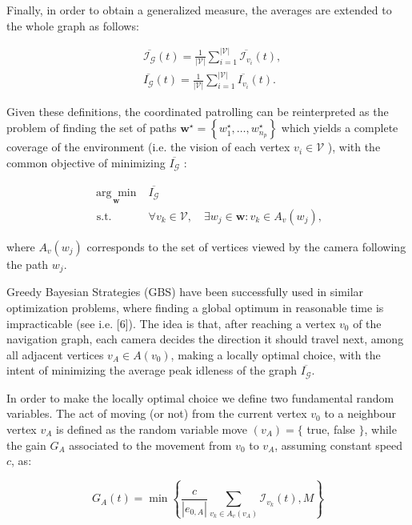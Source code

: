 \documentclass[conference]{IEEEtran}
\begin{document}
Finally, in order to obtain a generalized measure, the averages are extended to the whole graph as follows:


\begin{align*}
& \overline{\mathcal{I}_{\mathcal{G}}}(t)=\frac{1}{|\mathcal{V}|} \sum_{i=1}^{|\mathcal{V}|} \overline{\mathcal{I}_{v_{i}}}(t),  \tag{12}\\
& \overline{I_{\mathcal{G}}}(t)=\frac{1}{|\mathcal{V}|} \sum_{i=1}^{|\mathcal{V}|} \overline{I_{v_{i}}}(t) . \tag{13}
\end{align*}


Given these definitions, the coordinated patrolling can be reinterpreted as the problem of finding the set of paths $\mathbf{w}^{\star}=\left\{w_{1}^{\star}, \ldots, w_{n_{p}}^{\star}\right\}$ which yields a complete coverage of the environment (i.e. the vision of each vertex $v_{i} \in \mathcal{V}$ ), with the common objective of minimizing $\overline{I_{\mathcal{G}}}$ :


\begin{align*}
\underset{\mathbf{w}}{\arg \min } & \overline{I_{\mathcal{G}}} \\
\text { s.t. } & \forall v_{k} \in \mathcal{V}, \quad \exists w_{j} \in \mathbf{w}: v_{k} \in A_{v}\left(w_{j}\right), \tag{14}
\end{align*}


where $A_{v}\left(w_{j}\right)$ corresponds to the set of vertices viewed by the camera following the path $w_{j}$.

Greedy Bayesian Strategies (GBS) have been successfully used in similar optimization problems, where finding a global optimum in reasonable time is impracticable (see i.e. [6]). The idea is that, after reaching a vertex $v_{0}$ of the navigation graph, each camera decides the direction it should travel next, among all adjacent vertices $v_{A} \in A\left(v_{0}\right)$, making a locally optimal choice, with the intent of minimizing the average peak idleness of the graph $\overline{I_{\mathcal{G}}}$.

In order to make the locally optimal choice we define two fundamental random variables. The act of moving (or not) from the current vertex $v_{0}$ to a neighbour vertex $v_{A}$ is defined as the random variable move $\left(v_{A}\right)=\{$ true, false $\}$, while the gain $G_{A}$ associated to the movement from $v_{0}$ to $v_{A}$, assuming constant speed $c$, as:


\begin{equation*}
G_{A}(t)=\min \left\{\frac{c}{\left|e_{0, A}\right|} \sum_{v_{k} \in A_{v}\left(v_{A}\right)} \mathcal{I}_{v_{k}}(t), M\right\} \tag{15}
\end{equation*}
\end{document}
